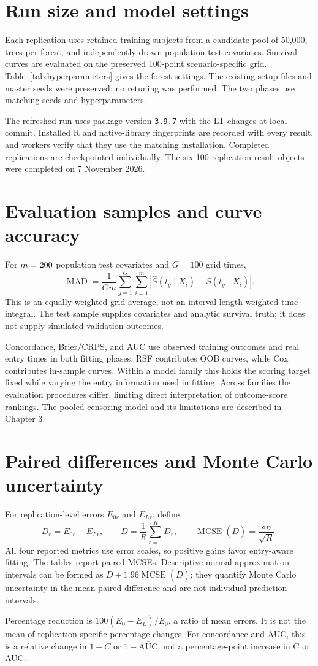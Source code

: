 \section{Run size and model settings}
Each replication uses \SimTrainN{} retained training subjects from a
candidate pool of 50,000, \SimTrees{} trees per forest, and
\SimTestN{} independently drawn population test covariates. Survival curves
are evaluated on the preserved 100-point scenario-specific grid.
Table~\ref{tab:hyperparameters} gives the forest settings. The existing
setup files and master seeds were preserved; no retuning was performed.
The two phases use matching seeds and hyperparameters.



The refreshed run uses package version \texttt{3.9.7} with the LT changes
at local commit. Installed R and native-library
fingerprints are recorded with every result, and workers verify that they
use the matching installation. Completed replications are checkpointed
individually. The six 100-replication result objects were completed on
7 November 2026.

\section{Evaluation samples and curve accuracy}
For $m=200$ population test covariates and $G=100$ grid times,
\[
 \operatorname{MAD}=\frac{1}{Gm}\sum_{g=1}^{G}\sum_{i=1}^{m}
 \left|\widehat S(t_g\mid X_i)-S(t_g\mid X_i)\right|.
\]
This is an equally weighted grid average, not an interval-length-weighted
time integral. The test sample supplies covariates and analytic survival
truth; it does not supply simulated validation outcomes.

Concordance, Brier/CRPS, and AUC use observed training outcomes and real
entry times in both fitting phases. RSF contributes OOB curves, while Cox
contributes in-sample curves. Within a model family this holds the scoring
target fixed while varying the entry information used in fitting.
Across families the evaluation procedures differ, limiting direct
interpretation of outcome-score rankings. The pooled censoring model and
its limitations are described in Chapter 3.

\section{Paired differences and Monte Carlo uncertainty}
For replication-level errors $E_{0r}$ and $E_{Lr}$, define
\[
 D_r=E_{0r}-E_{Lr},\qquad
 \overline D=\frac{1}{R}\sum_{r=1}^R D_r,\qquad
 \operatorname{MCSE}(\overline D)=\frac{s_D}{\sqrt R}.
\]
All four reported metrics use error scales, so positive gains favor
entry-aware fitting. The tables report paired MCSEs. Descriptive
normal-approximation intervals can be formed as
$\overline D\pm1.96\operatorname{MCSE}(\overline D)$; they quantify
Monte Carlo uncertainty in the mean paired difference and are not
individual prediction intervals.

Percentage reduction is
$100(\overline E_0-\overline E_L)/\overline E_0$, a ratio of mean errors.
It is not the mean of replication-specific percentage changes.
For concordance and AUC, this is a relative change in $1-C$ or
$1-\overline{\mathrm{AUC}}$, not a percentage-point increase in C or AUC.
